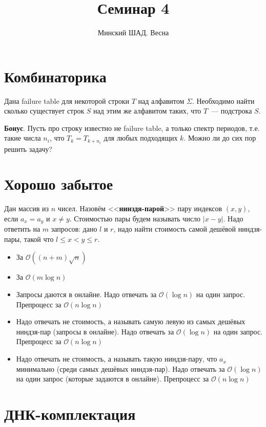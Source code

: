 \documentclass[addpoints]{exam}
\title{Семинар 4}
\author{Минский ШАД. Весна}
\begin{document}
\maketitle

\section{Комбинаторика}

Дана failure table для некоторой строки $T$ над алфавитом $\Sigma$. Необходимо найти сколько существует строк $S$ над этим же алфавитом таких, что $T$~--- подстрока $S$.

\textbf{Бонус}. Пусть про строку известно не failure table, а только спектр периодов, т.е. такие числа $n_i$, что $T_k = T_{k+n_i}$ для любых подходящих $k$. Можно ли до сих пор решить задачу?

\section{Хорошо забытое}

Дан массив из $n$ чисел. Назовём <<\textbf{нинздя-парой}>> пару индексов $(x,y)$, если $a_x = a_y$ и $x \neq y$. Стоимостью пары будем называть число $|x - y|$. Надо ответить на $m$ запросов: дано $l$ и $r$, надо найти стоимость самой дешёвой ниндзя-пары, такой что $l \leqslant x < y \leqslant r$.

\begin{itemize}
\item За $\mathcal{O}((n + m) \sqrt{n})$
\item За $\mathcal{O}(m \log{n})$
\item Запросы даются в онлайне. Надо отвечать за $\mathcal{O}(\log{n})$ на один запрос. Препроцесс за $\mathcal{O}(n \log{n})$
\item Надо отвечать не стоимость, а называть самую левую из самых дешёвых ниндзя-пар (запросы в онлайне). Надо отвечать за $\mathcal{O}(\log{n})$ на один запрос. Препроцесс за $\mathcal{O}(n \log{n})$
\item Надо отвечать не стоимость, а называть такую ниндзя-пару, что $a_x$ минимально (среди самых дешёвых ниндзя-пар). Надо отвечать за $\mathcal{O}(\log{n})$ на один запрос (которые задаются в онлайне). Препроцесс за $\mathcal{O}(n \log{n})$
\end{itemize}

\section{ДНК-комплектация}
\end{document}
